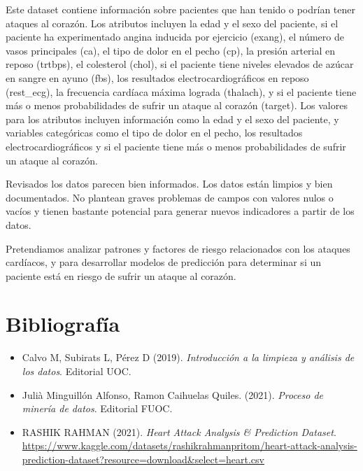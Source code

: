 \documentclass[
]{article}
\providecommand{\tightlist}{%
  \setlength{\itemsep}{0pt}\setlength{\parskip}{0pt}}
\begin{document}
Este dataset contiene información sobre pacientes que han tenido o
podrían tener ataques al corazón. Los atributos incluyen la edad y el
sexo del paciente, si el paciente ha experimentado angina inducida por
ejercicio (exang), el número de vasos principales (ca), el tipo de dolor
en el pecho (cp), la presión arterial en reposo (trtbps), el colesterol
(chol), si el paciente tiene niveles elevados de azúcar en sangre en
ayuno (fbs), los resultados electrocardiográficos en reposo (rest\_ecg),
la frecuencia cardíaca máxima lograda (thalach), y si el paciente tiene
más o menos probabilidades de sufrir un ataque al corazón (target). Los
valores para los atributos incluyen información como la edad y el sexo
del paciente, y variables categóricas como el tipo de dolor en el pecho,
los resultados electrocardiográficos y si el paciente tiene más o menos
probabilidades de sufrir un ataque al corazón.

Revisados los datos parecen bien informados. Los datos están limpios y
bien documentados. No plantean graves problemas de campos con valores
nulos o vacíos y tienen bastante potencial para generar nuevos
indicadores a partir de los datos.

Pretendiamos analizar patrones y factores de riesgo relacionados con los
ataques cardíacos, y para desarrollar modelos de predicción para
determinar si un paciente está en riesgo de sufrir un ataque al corazón.

\hypertarget{bibliografuxeda}{%
\section{Bibliografía}\label{bibliografuxeda}}

\begin{itemize}
\tightlist
\item
  Calvo M, Subirats L, Pérez D (2019). \emph{Introducción a la limpieza
  y análisis de los datos}. Editorial UOC.
\item
  Julià Minguillón Alfonso, Ramon Caihuelas Quiles. (2021).
  \emph{Proceso de minería de datos}. Editorial FUOC.
\item
  RASHIK RAHMAN (2021). \emph{Heart Attack Analysis \& Prediction
  Dataset}.
  \url{https://www.kaggle.com/datasets/rashikrahmanpritom/heart-attack-analysis-prediction-dataset?resource=download\&select=heart.csv}
\end{itemize}
\end{document}
